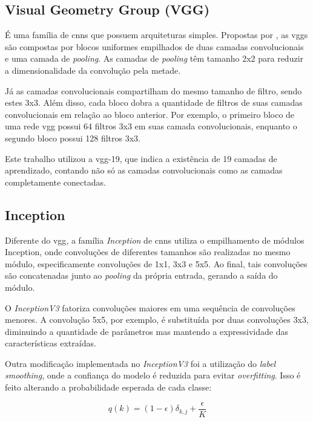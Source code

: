 \subsection{Visual Geometry Group (VGG)}
É uma família de \acrshort{cnn}s que possuem arquiteturas simples. Propostas por \cite{vgg}, as \acrshort{vgg}s são compostas por blocos uniformes empilhados de duas camadas convolucionais e uma camada de \textit{pooling}. As camadas de \textit{pooling} têm tamanho 2x2 para reduzir a dimensionalidade da convolução pela metade. 

Já as camadas convolucionais compartilham do mesmo tamanho de filtro, sendo estes 3x3. Além disso, cada bloco dobra a quantidade de filtros de suas camadas convolucionais em relação ao bloco anterior. Por exemplo, o primeiro bloco de uma rede \acrshort{vgg} possui 64 filtros 3x3 em suas camada convolucionais, enquanto o segundo bloco possui 128 filtros 3x3.

Este trabalho utilizou a \acrshort{vgg}-19, que indica a existência de 19 camadas de aprendizado, contando não só as camadas convolucionais como as camadas completamente conectadas.
\subsection{Inception}

Diferente do \acrshort{vgg}, a família \textit{Inception}\cite{inception} de \acrshort{cnn}s utiliza o empilhamento de módulos Inception, onde convoluções de diferentes tamanhos são realizadas no mesmo módulo, especificamente convoluções de 1x1, 3x3 e 5x5. Ao final, tais convoluções são concatenadas junto ao \textit{pooling} da própria entrada, gerando a saída do módulo. 

O \textit{InceptionV3}\cite{inceptionv3} fatoriza convoluções maiores em uma sequência de convoluções menores. A convolução 5x5, por exemplo, é substituída por duas convoluções 3x3, diminuindo a quantidade de parâmetros mas mantendo a expressividade das características extraídas.

Outra modificação implementada no \textit{InceptionV3} foi a utilização do \textit{label smoothing}, onde a confiança do modelo é reduzida para evitar \textit{overfitting}. Isso é feito alterando a probabilidade esperada de cada classe:

\begin{equation}
    \label{eqn:labelsmoothing}
     q(k) = (1-\epsilon )\delta _{k,j}+\frac{\epsilon }{K}
\end{equation}


